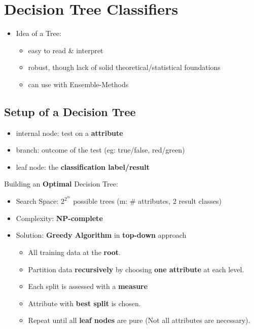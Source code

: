 \section{Decision Tree Classifiers}
\begin{itemize}
	\item Idea of a Tree: 
	\begin{itemize}
		\item easy to read \& interpret
		\item robust, though lack of solid theoretical/statistical foundations
		\item can use with Ensemble-Methods
	\end{itemize}
\end{itemize}

\subsection{Setup of a Decision Tree}
\begin{itemize}
	\item internal node: test on a \textbf{attribute}
	\item branch: outcome of the test (eg: true/false, red/green)
	\item leaf node: the \textbf{classification label/result}
\end{itemize}

Building an \textbf{Optimal} Decision Tree:
\begin{itemize}
	\item Search Space: $2^{2^m}$ possible trees (m: \# attributes, 2 result classes)
	\item Complexity: \textbf{NP-complete}
	\item Solution: \textbf{Greedy Algorithm} in \textbf{top-down} approach
	\begin{itemize}
		\item All training data at the \textbf{root}.
		\item Partition data \textbf{recursively} by choosing \textbf{one attribute} at each level.
		\item Each split is assessed with a \textbf{measure}
		\item Attribute with \textbf{best split} is chosen.
		\item Repeat until all \textbf{leaf nodes} are pure (Not all attributes are necessary).
	\end{itemize}
\end{itemize}

